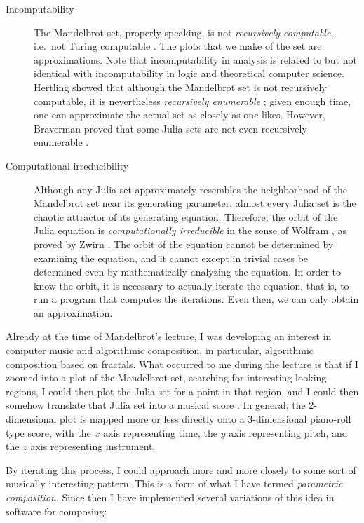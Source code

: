 \documentclass[11pt]{scrartcl}
\begin{document}
\begin{description}
\item[Incomputability] The Mandelbrot set, properly speaking, is not \emph{recursively computable}, i.e.\ not Turing computable \parencite{blum1993godel}. The plots that we make of the set are approximations. Note that incomputability in analysis is related to but not identical with incomputability in logic and theoretical computer science. Hertling showed that although the  Mandelbrot set is not recursively computable, it is nevertheless \emph{recursively enumerable} \parencite{Hertling2005-HERITM-3}; given enough time, one can approximate the actual set as closely as one likes. However, Braverman proved that some Julia sets are not even recursively enumerable \parencite{braverman2006non, braverman2009computability}.
\item[Computational irreducibility] Although any Julia set approximately resembles the neighborhood of the Mandelbrot set near its generating parameter, almost every Julia set is the chaotic attractor of its generating equation. Therefore, the orbit of the Julia equation is \emph{computationally irreducible} in the sense of Wolfram \parencite{wolfram1985undecidability}, as proved by Zwirn \parencite{zwirn2015computational}. The orbit of the equation cannot be determined by examining the equation, and it cannot except in trivial cases be determined even by mathematically analyzing the equation. In order to know the orbit, it is necessary to actually iterate the equation, that is, to run a program that computes the iterations. Even then, we can only obtain an approximation.
\end{description}

Already at the time of Mandelbrot's lecture, I was developing an interest in computer music and algorithmic composition, in particular, algorithmic composition based on fractals. What occurred to me during the lecture is that if I zoomed into a plot of the Mandelbrot set, searching for interesting-looking regions, I could then plot the Julia set for a point in that region, and I could then somehow translate that Julia set into a musical score \parencite{obsessed}. In general, the 2-dimensional plot is mapped more or less directly onto a 3-dimensional piano-roll type score, with the $x$ axis representing time, the $y$ axis representing pitch, and the $z$ axis representing instrument.

By iterating this process, I could approach more and more closely to some sort of musically interesting pattern. This is a form of what I have termed \emph{parametric composition}. Since then I have implemented several variations of this idea in software for composing:
\end{document}
